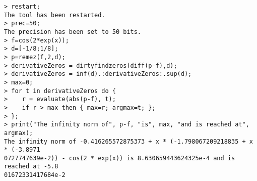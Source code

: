 \begin{center}\begin{minipage}{15cm}\begin{Verbatim}[frame=single]
> restart;
The tool has been restarted.
> prec=50;
The precision has been set to 50 bits.
> f=cos(2*exp(x));
> d=[-1/8;1/8];
> p=remez(f,2,d);
> derivativeZeros = dirtyfindzeros(diff(p-f),d);
> derivativeZeros = inf(d).:derivativeZeros:.sup(d);
> max=0;
> for t in derivativeZeros do {
>    r = evaluate(abs(p-f), t);
>    if r > max then { max=r; argmax=t; };
> };
> print("The infinity norm of", p-f, "is", max, "and is reached at", argmax);
The infinity norm of -0.416265572875373 + x * (-1.798067209218835 + x * (-3.8971
0727747639e-2)) - cos(2 * exp(x)) is 8.630659443624325e-4 and is reached at -5.8
01672331417684e-2
\end{Verbatim}
\end{minipage}\end{center}
